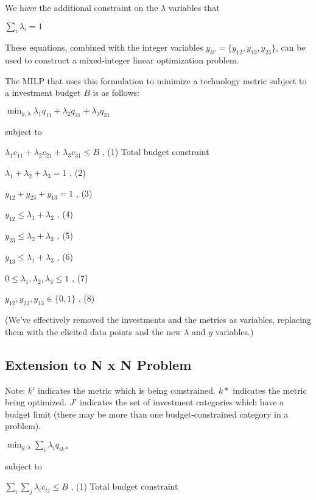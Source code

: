 \documentclass[letterpaper,10pt,english]{sphinxmanual}
\begin{document}
We have the additional constraint on the \(\lambda\) variables that

\(\sum_{i} \lambda_{i} = 1\)

These equations, combined with the integer variables \(y_{ii'} = \{ y_{12}, y_{13}, y_{23} \}\), can be used to construct a mixed-integer linear optimization problem.

The MILP that uses this formulation to minimize a technology metric subject to a investment budget \(B\) is as follows:

\(\min_{y, \lambda} \lambda_{1}q_{11} + \lambda_{2}q_{21} + \lambda_{3}q_{31}\)

subject to

\(\lambda_{1}c_{11} + \lambda_{2}c_{21} + \lambda_{3}c_{31} \leq B\) , (1) Total budget constraint

\(\lambda_1 + \lambda_2 + \lambda_3 = 1\) , (2)

\(y_{12} + y_{23} + y_{13} = 1\) , (3)

\(y_{12} \leq \lambda_1 + \lambda_2\) , (4)

\(y_{23} \leq \lambda_2 + \lambda_3\) , (5)

\(y_{13} \leq \lambda_1 + \lambda_3\) , (6)

\(0 \leq \lambda_1, \lambda_2, \lambda_3 \leq 1\) , (7)

\(y_{12}, y_{23}, y_{13} \in \{ 0, 1 \}\) , (8)

(We’ve effectively removed the investments and the metrics as variables, replacing them with the elicited data points and the new \(\lambda\) and \(y\) variables.)


\subsection{Extension to N x N Problem}
\label{\detokenize{optimizers:extension-to-n-x-n-problem}}
Note: \(k'\) indicates the metric which is being constrained. \(k*\) indicates the metric being optimized. \(J'\) indicates the set of investment categories which have a budget limit (there may be more than one budget-constrained category in a problem).


\(\min_{y, \lambda} \sum_i \lambda_{i}q_{ik*}\)

subject to

\(\sum_i \sum_j \lambda_{i}c_{ij} \leq B\) , (1) Total budget constraint
\end{document}
